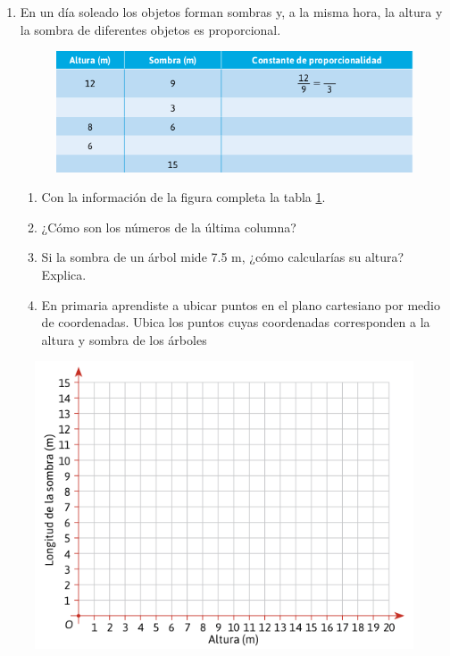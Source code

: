 \documentclass[11pt]{book}
\begin{document}
\begin{minipage}[t]{0.75\textwidth}
  \begin{enumerate}
    \item En un día soleado los objetos forman sombras y, a la misma hora, la altura y la
          sombra de diferentes objetos es proporcional.
          \begin{flushright}
            \begin{figure}[H]
              \centering
              \includegraphics[width=0.85\linewidth]{tabla_sombras.png}
              \label{tab:tabla_sombras}
            \end{figure}
          \end{flushright}
          \begin{enumerate}
            \item Con la información de la figura completa la tabla \ref{tab:tabla_sombras}.
            \item ¿Cómo son los números de la última columna?
            \item Si la sombra de un árbol mide 7.5 m, ¿cómo calcularías su altura? Explica.
            \item  En primaria aprendiste a ubicar puntos en el plano cartesiano por medio de
                  coordenadas. Ubica los puntos cuyas coordenadas corresponden a la altura y sombra de los árboles
          \end{enumerate}
  \end{enumerate}
\end{minipage}
\newpage
\begin{figure}[H]
  \centering
  \includegraphics[width=.75\linewidth]{plano_sombras.png}
\end{figure}
\end{document}

